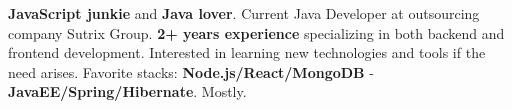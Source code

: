 

\begin{cvparagraph}

\textbf{JavaScript junkie} and \textbf{Java lover}. Current Java Developer at outsourcing company Sutrix Group. \textbf{2+ years experience} specializing in both backend and frontend development. Interested in learning new technologies and tools if the need arises. Favorite stacks: \textbf{Node.js/React/MongoDB} - \textbf{JavaEE/Spring/Hibernate}. Mostly.
\end{cvparagraph}
